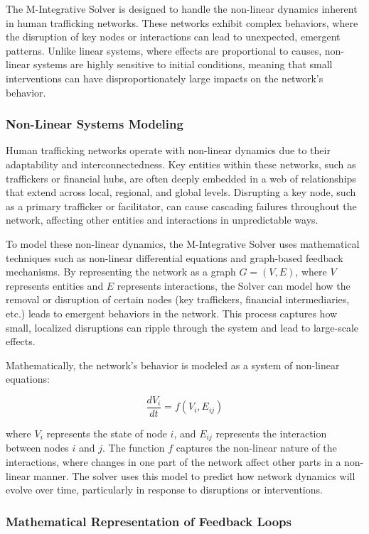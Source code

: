 \documentclass[%
 preprint, linenumbers,
 amsmath,amssymb,
 aps, physrev,
]{revtex4-2}
\begin{document}
The M-Integrative Solver is designed to handle the non-linear dynamics inherent in human trafficking networks. These networks exhibit complex behaviors, where the disruption of key nodes or interactions can lead to unexpected, emergent patterns. Unlike linear systems, where effects are proportional to causes, non-linear systems are highly sensitive to initial conditions, meaning that small interventions can have disproportionately large impacts on the network's behavior.

\subsubsection{Non-Linear Systems Modeling}

Human trafficking networks operate with non-linear dynamics due to their adaptability and interconnectedness. Key entities within these networks, such as traffickers or financial hubs, are often deeply embedded in a web of relationships that extend across local, regional, and global levels. Disrupting a key node, such as a primary trafficker or facilitator, can cause cascading failures throughout the network, affecting other entities and interactions in unpredictable ways.

To model these non-linear dynamics, the M-Integrative Solver uses mathematical techniques such as non-linear differential equations and graph-based feedback mechanisms. By representing the network as a graph \( G = (V, E) \), where \( V \) represents entities and \( E \) represents interactions, the Solver can model how the removal or disruption of certain nodes (key traffickers, financial intermediaries, etc.) leads to emergent behaviors in the network. This process captures how small, localized disruptions can ripple through the system and lead to large-scale effects.

Mathematically, the network's behavior is modeled as a system of non-linear equations:

\[
\frac{dV_i}{dt} = f(V_i, E_{ij})
\]

where \( V_i \) represents the state of node \( i \), and \( E_{ij} \) represents the interaction between nodes \( i \) and \( j \). The function \( f \) captures the non-linear nature of the interactions, where changes in one part of the network affect other parts in a non-linear manner. The solver uses this model to predict how network dynamics will evolve over time, particularly in response to disruptions or interventions.

\subsubsection{Mathematical Representation of Feedback Loops}
\end{document}
